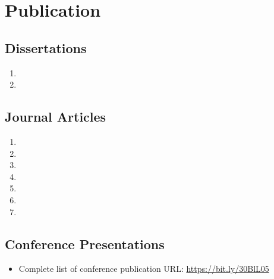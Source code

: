 \documentclass{my_cv}%
\begin{document}
\section{Publication}
\vspace{1em}
%

\subsection{\faBook \hspace{0.2em} \bfseries Dissertations}
\vspace{1em}
\begin{enumerate}
\setlength\itemsep{-0.1em}
\color{mygray}
 \item {}
 \item {}
\end{enumerate}

\subsection{\faFileTextO \hspace{0.5em}\bfseries Journal Articles}
\vspace{1em}
\begin{enumerate}
\setlength\itemsep{-0.1em}
\color{mygray}
 \item {}
 \item {}
 \item {}
 \item {}
 \item {}
 \item {}
 \item {}
\end{enumerate}

\subsection{\faFilePowerpointO \hspace{0.5em}\bfseries Conference Presentations}
\begin{itemize}
\setlength\itemsep{-0.1em}
\color{mygray}
\item Complete list of conference publication URL: \href{https://bit.ly/30BlL05}{https://bit.ly/30BlL05}
\end{itemize}
\end{document}
